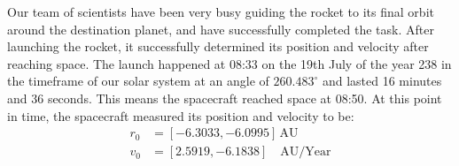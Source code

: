 \documentclass[reprint,english,notitlepage]{revtex4-2}
\begin{document}
    Our team of scientists have been very busy guiding the rocket to its final orbit around the destination planet, and have successfully completed the task.
    After launching the rocket, it successfully determined its position and velocity after reaching space.
    The launch happened at 08:33 on the 19th July of the year 238 in the timeframe of our solar system at an angle of $260.483^{\circ}$ and lasted 16 minutes and 36 seconds.
    This means the spacecraft reached space at 08:50.
    At this point in time, the spacecraft measured its position and velocity to be:
    \begin{align*}
        r_0 &= [-6.3033, -6.0995] \,\text{AU}\\
        v_0 &= [ 2.5919, -6.1838] \quad\text{AU/Year}
    \end{align*}
\end{document}
